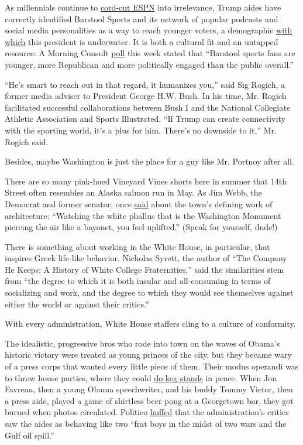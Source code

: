 As millennials continue to
\href{https://www.nytimes3xbfgragh.onion/2017/11/14/magazine/spurned-by-espn-barstool-sports-is-staying-on-offense.html}{cord-cut
ESPN} into irrelevance, Trump aides have correctly identified Barstool
Sports and its network of popular podcasts and social media
personalities as a way to reach younger voters, a demographic
\href{https://www.nytimes3xbfgragh.onion/2020/07/01/upshot/poll-trump-defectors-2020-election.html}{with
which} this president is underwater. It is both a cultural fit and an
untapped resource: A Morning Consult
\href{https://morningconsult.com/2020/07/24/barstool-sports-trump-interview-polling/}{poll}
this week stated that ``Barstool sports fans are younger, more
Republican and more politically engaged than the public overall.''

``He's smart to reach out in that regard, it humanizes you,'' said Sig
Rogich, a former media adviser to President George H.W. Bush. In his
time, Mr. Rogich facilitated successful collaborations between Bush I
and the National Collegiate Athletic Association and Sports Illustrated.
``If Trump can create connectivity with the sporting world, it's a plus
for him. There's no downside to it,'' Mr. Rogich said.

Besides, maybe Washington is just the place for a guy like Mr. Portnoy
after all.

There are so many pink-hued Vineyard Vines shorts here in summer that
14th Street often resembles an Alaska salmon run in May. As Jim Webb,
the Democrat and former senator, once
\href{https://www.nytimes3xbfgragh.onion/2006/11/05/opinion/05brooks.html}{said}
about the town's defining work of architecture: ``Watching the white
phallus that is the Washington Monument piercing the air like a bayonet,
you feel uplifted.'' (Speak for yourself, dude!)

There is something about working in the White House, in particular, that
inspires Greek life-like behavior. Nicholas Syrett, the author of ``The
Company He Keeps: A History of White College Fraternities,'' said the
similarities stem from ``the degree to which it is both insular and
all-consuming in terms of socializing and work, and the degree to which
they would see themselves against either the world or against their
critics.''

With every administration, White House staffers cling to a culture of
conformity.

The idealistic, progressive bros who rode into town on the waves of
Obama's historic victory were treated as young princes of the city, but
they became wary of a press corps that wanted every little piece of
them. Their modus operandi was to throw house parties, where they could
\href{https://www.nytimes3xbfgragh.onion/2010/05/02/magazine/02obamastaff-t.html}{do
keg stands} in peace. When Jon Favreau, then a young Obama speechwriter,
and his buddy Tommy Vietor, then a press aide, played a game of
shirtless beer pong at a Georgetown bar, they got burned when photos
circulated. Politico
\href{https://www.politico.com/story/2010/06/are-obama-staffers-overexposed-038374}{huffed}
that the administration's critics saw the aides as behaving like two
``frat boys in the midst of two wars and the Gulf oil spill.''

